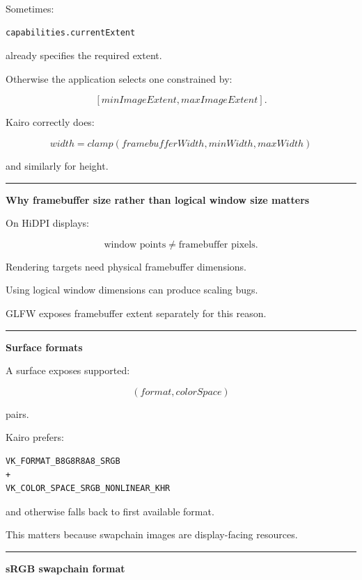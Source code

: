 Sometimes:

\begin{verbatim}
capabilities.currentExtent
\end{verbatim}

already specifies the required extent.

Otherwise the application selects one constrained by:

\[
[minImageExtent,maxImageExtent].
\]

Kairo correctly does:

\[
width=
clamp(
framebufferWidth,
minWidth,
maxWidth
)
\]

and similarly for height.

\begin{center}\rule{0.5\linewidth}{0.5pt}\end{center}

\textbf{Why framebuffer size rather than logical window size matters}

On HiDPI displays:

\[
\text{window points}
\neq
\text{framebuffer pixels}.
\]

Rendering targets need physical framebuffer dimensions.

Using logical window dimensions can produce scaling bugs.

GLFW exposes framebuffer extent separately for this reason.

\begin{center}\rule{0.5\linewidth}{0.5pt}\end{center}

\textbf{Surface formats}

A surface exposes supported:

\[
(format,colorSpace)
\]

pairs.

Kairo prefers:

\begin{verbatim}
VK_FORMAT_B8G8R8A8_SRGB
+
VK_COLOR_SPACE_SRGB_NONLINEAR_KHR
\end{verbatim}

and otherwise falls back to first available format.

This matters because swapchain images are display-facing resources.

\begin{center}\rule{0.5\linewidth}{0.5pt}\end{center}

\textbf{sRGB swapchain format}

